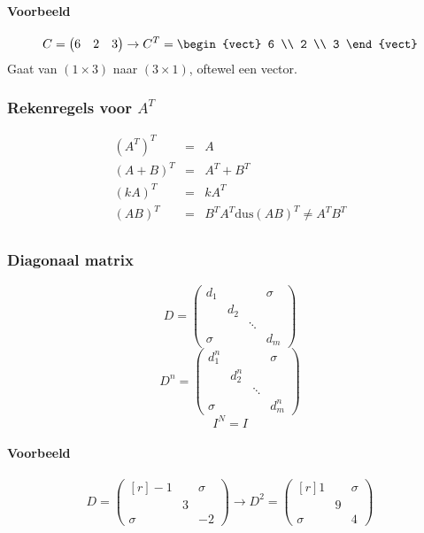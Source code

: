 \paragraph{Voorbeeld}
\[C = \begin{pmatrix*} 6 & 2 & 3 \end{pmatrix*} \to C^T = \begin{vect} 6 \\ 2 \\ 3 \end{vect} \]
Gaat van $(1 \times 3)$ naar $(3 \times 1)$, oftewel een vector.

\subsubsection{Rekenregels voor $A^T$}
\begin{eqnarray*}
	{(A^T)}^T &=& A \\
	(A+B)^T &=& A^T + B^T \\
	(kA)^T &=& kA^T \\
	(AB)^T &=& B^T A^T \mbox{dus} (AB)^T \neq A^T B^T \\
\end{eqnarray*}

\subsubsection{Diagonaal matrix}
\[ D = \begin{pmatrix}
	d_1 & & &\sigma \\
	& d_2 & &\\
	& & \ddots & \\
	\sigma & & & d_m
\end{pmatrix} \]
\[ D^n = \begin{pmatrix}
	d_1^n & & &\sigma \\
	& d_2^n & &\\
	& & \ddots & \\
	\sigma & & & d_m^n
\end{pmatrix} \]
\[ I^N = I \]

\paragraph{Voorbeeld}
\[D = \begin{pmatrix*}[r] -1 & & \sigma \\ & 3 &  \\ \sigma && -2 \end{pmatrix*} \to D^2 = \begin{pmatrix*}[r] 1 & & \sigma \\ & 9 &  \\ \sigma && 4 \end{pmatrix*} \]